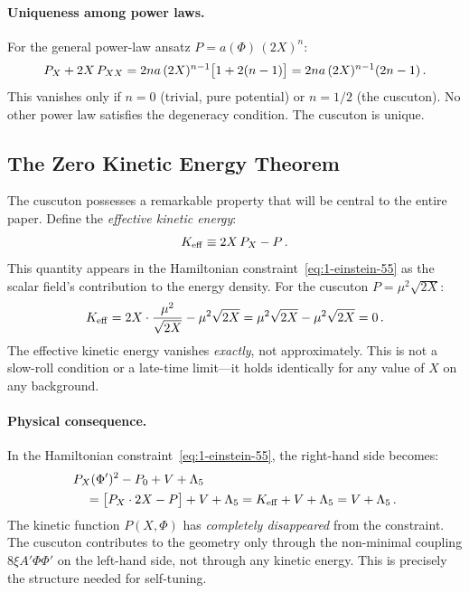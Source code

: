 \paragraph{Uniqueness among power laws.} For the general power-law ansatz $P = a(\Phi)\,(2X)^n$:
\begin{equation}
\label{eq:1-uniqueness}
P_X + 2X\,P_{XX} = 2na\,(2X)^{n-1}\bigl[1 + 2(n-1)\bigr] = 2na\,(2X)^{n-1}(2n-1)\,.
\end{equation}
This vanishes only if $n = 0$ (trivial, pure potential) or $n = 1/2$ (the cuscuton). No other power law satisfies the degeneracy condition. The cuscuton is unique.

\subsection{The Zero Kinetic Energy Theorem}
\label{sec:1-zke}

The cuscuton possesses a remarkable property that will be central to the entire paper. Define the \emph{effective kinetic energy}:
\begin{equation}
\label{eq:1-keff-def}
K_{\mathrm{eff}} \equiv 2X\,P_X - P\,.
\end{equation}
This quantity appears in the Hamiltonian constraint~\eqref{eq:1-einstein-55} as the scalar field's contribution to the energy density. For the cuscuton $P = \mu^2\sqrt{2X}$:
\begin{equation}
\label{eq:1-keff-zero}
K_{\mathrm{eff}} = 2X \cdot \frac{\mu^2}{\sqrt{2X}} - \mu^2\sqrt{2X}
= \mu^2\sqrt{2X} - \mu^2\sqrt{2X} = 0\,.
\end{equation}
The effective kinetic energy vanishes \emph{exactly}, not approximately. This is not a slow-roll condition or a late-time limit---it holds identically for any value of $X$ on any background.

\paragraph{Physical consequence.} In the Hamiltonian constraint~\eqref{eq:1-einstein-55}, the right-hand side becomes:
\begin{align}
\label{eq:1-rhs-simplify}
&P_X(\Phi')^2 - P_0 + V + \Lambda_5
\notag\\
&\quad = \bigl[P_X \cdot 2X - P\bigr] + V + \Lambda_5
= K_{\mathrm{eff}} + V + \Lambda_5 = V + \Lambda_5\,.
\end{align}
The kinetic function $P(X, \Phi)$ has \emph{completely disappeared} from the constraint. The cuscuton contributes to the geometry only through the non-minimal coupling $8\xi A'\Phi\Phi'$ on the left-hand side, not through any kinetic energy. This is precisely the structure needed for self-tuning.

